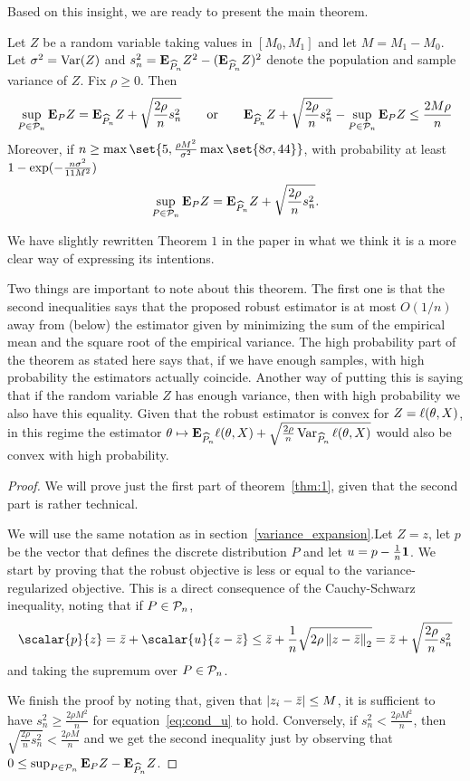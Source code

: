 Based on this insight, we are ready to present the main theorem.
\begin{theorem}\label{thm:1}
    Let $Z$ be a random variable taking values in $[M_0, M_1]$ and let $M = M_1 - M_0$. Let $\sigma^2 = \operatorname{Var}(Z)$ and $s^2_n = \mathbf{E}_{\widehat{P}_n} Z^2 - \lparen\mathbf{E}_{\widehat{P}_n} Z\rparen^2$ denote the population and sample variance of $Z$. Fix $\rho \geq 0$. Then
    \[
    \sup_{P \in\mathcal{P}_n}\mathbf{E}_P Z = \mathbf{E}_{\widehat{P}_n} Z + \sqrt{\frac{2\rho}{n}s^2_n}
    \qquad \text{or} \qquad
    \mathbf{E}_{\widehat{P}_n} Z + \sqrt{\frac{2\rho}{n}s^2_n} - \sup_{P \in \mathcal{P}_n}\mathbf{E}_P Z \leq \frac{2M\rho}{n}
    \]
    Moreover, if $n \geq \max\set{5, \frac{\rho M^2}{\sigma^2}\max\set{8\sigma, 44}}$, with probability at least $1-\exp\lparen-\frac{n\sigma^2}{11M^2}\rparen$
    \[
        \sup_{P \in \mathcal{P}_n} \mathbf{E}_P Z = \mathbf{E}_{\widehat{P}_n} Z + \sqrt{\frac{2\rho}{n} s^2_n}.
    \]
\end{theorem}
We have slightly rewritten Theorem $1$ in the paper in what we think it is a more clear way of expressing its intentions.

Two things are important to note about this theorem. The first one is that the second inequalities says that the proposed robust estimator is at most $O(1/n)$ away from (below) the estimator given by minimizing the sum of the empirical mean and the square root of the empirical variance. The high probability part of the theorem as stated here says that, if we have enough samples, with high probability the estimators actually coincide. Another way of putting this is saying that if the random variable $Z$ has enough variance, then with high probability we also have this equality. Given that the robust estimator is convex for $Z = \ell(\theta, X)$, in this regime the estimator $\theta \mapsto \mathbf{E}_{\widehat{P}_n} \ell(\theta, X) + \sqrt{\frac{2\rho}{n}\operatorname{Var}_{\widehat{P}_n}\ell(\theta, X)}$ would also be convex with high probability.
\begin{proof}
    We will prove just the first part of theorem~\ref{thm:1}, given that the second part is rather technical.

    We will use the same notation as in section~\ref{variance_expansion}.Let $Z = z$, let $p$ be the vector that defines the discrete distribution $P$ and let $u = p - \frac{1}{n}\mathbf{1}$. We start by proving that the robust objective is less or equal to the variance-regularized objective. This is a direct consequence of the Cauchy-Schwarz inequality, noting that if $P \in \mathcal{P}_n$,
    \[
        \scalar{p}{z} = \mean{z} + \scalar{u}{z-\mean{z}} \leq \mean{z} + \frac{1}{n}\sqrt{2\rho \enorm{z-\mean{z}}} = \mean{z} + \sqrt{\frac{2\rho}{n} s^2_n}
    \]
    and taking the supremum over $P \in \mathcal{P}_n$.

    We finish the proof by noting that, given that $\lvert z_i - \bar{z}\rvert \leq M$, it is sufficient to have $s^2_n \geq \frac{2\rho M^2}{n}$ for equation~\eqref{eq:cond_u} to hold. Conversely, if $s^2_n < \frac{2\rho M^2}{n}$, then $\sqrt{\frac{2\rho}{n}s^2_n} < \frac{2\rho M}{n}$ and we get the second inequality just by observing that $0 \leq \sup_{P \in \mathcal{P}_n} \mathbf{E}_P Z - \mathbf{E}_{\widehat{P}_n} Z$.
\end{proof}

